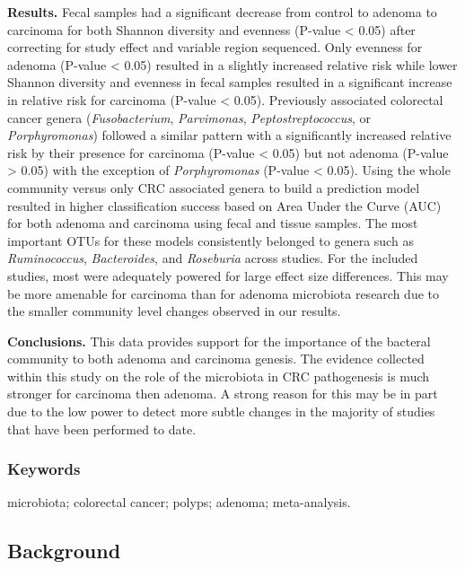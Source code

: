 \documentclass[12pt,]{article}
\begin{document}
\textbf{Results.} Fecal samples had a significant decrease from control
to adenoma to carcinoma for both Shannon diversity and evenness (P-value
\textless{} 0.05) after correcting for study effect and variable region
sequenced. Only evenness for adenoma (P-value \textless{} 0.05) resulted
in a slightly increased relative risk while lower Shannon diversity and
evenness in fecal samples resulted in a significant increase in relative
risk for carcinoma (P-value \textless{} 0.05). Previously associated
colorectal cancer genera (\emph{Fusobacterium}, \emph{Parvimonas},
\emph{Peptostreptococcus}, or \emph{Porphyromonas}) followed a similar
pattern with a significantly increased relative risk by their presence
for carcinoma (P-value \textless{} 0.05) but not adenoma (P-value
\textgreater{} 0.05) with the exception of \emph{Porphyromonas} (P-value
\textless{} 0.05). Using the whole community versus only CRC associated
genera to build a prediction model resulted in higher classification
success based on Area Under the Curve (AUC) for both adenoma and
carcinoma using fecal and tissue samples. The most important OTUs for
these models consistently belonged to genera such as
\emph{Ruminococcus}, \emph{Bacteroides}, and \emph{Roseburia} across
studies. For the included studies, most were adequately powered for
large effect size differences. This may be more amenable for carcinoma
than for adenoma microbiota research due to the smaller community level
changes observed in our results.

\textbf{Conclusions.} This data provides support for the importance of
the bacteral community to both adenoma and carcinoma genesis. The
evidence collected within this study on the role of the microbiota in
CRC pathogenesis is much stronger for carcinoma then adenoma. A strong
reason for this may be in part due to the low power to detect more
subtle changes in the majority of studies that have been performed to
date.

\subsubsection{Keywords}\label{keywords}

microbiota; colorectal cancer; polyps; adenoma; meta-analysis.

\newpage

\subsection{Background}\label{background}
\end{document}
